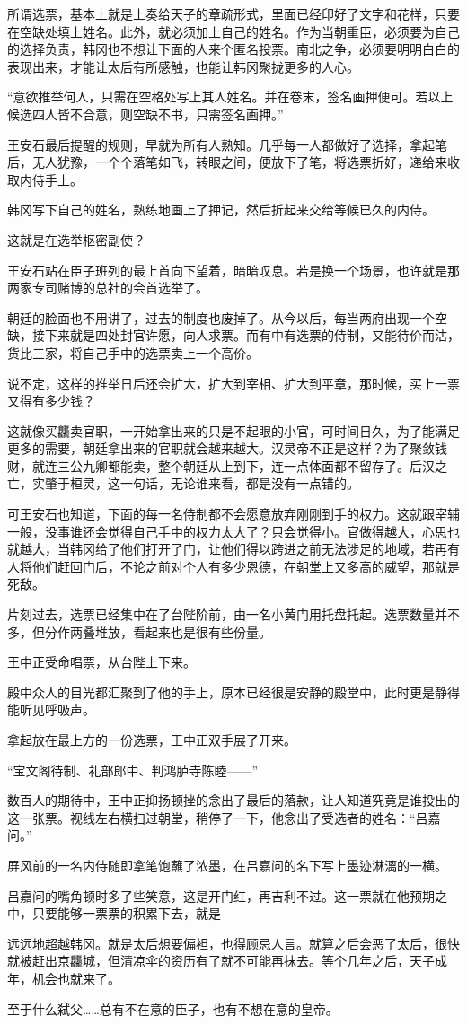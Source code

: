 所谓选票，基本上就是上奏给天子的章疏形式，里面已经印好了文字和花样，只要在空缺处填上姓名。此外，就必须加上自己的姓名。作为当朝重臣，必须要为自己的选择负责，韩冈也不想让下面的人来个匿名投票。南北之争，必须要明明白白的表现出来，才能让太后有所感触，也能让韩冈聚拢更多的人心。

“意欲推举何人，只需在空格处写上其人姓名。并在卷末，签名画押便可。若以上候选四人皆不合意，则空缺不书，只需签名画押。”

王安石最后提醒的规则，早就为所有人熟知。几乎每一人都做好了选择，拿起笔后，无人犹豫，一个个落笔如飞，转眼之间，便放下了笔，将选票折好，递给来收取内侍手上。

韩冈写下自己的姓名，熟练地画上了押记，然后折起来交给等候已久的内侍。

这就是在选举枢密副使？

王安石站在臣子班列的最上首向下望着，暗暗叹息。若是换一个场景，也许就是那两家专司赌博的总社的会首选举了。

朝廷的脸面也不用讲了，过去的制度也废掉了。从今以后，每当两府出现一个空缺，接下来就是四处封官许愿，向人求票。而有中有选票的侍制，又能待价而沽，货比三家，将自己手中的选票卖上一个高价。

说不定，这样的推举日后还会扩大，扩大到宰相、扩大到平章，那时候，买上一票又得有多少钱？

这就像买龘卖官职，一开始拿出来的只是不起眼的小官，可时间日久，为了能满足更多的需要，朝廷拿出来的官职就会越来越大。汉灵帝不正是这样？为了聚敛钱财，就连三公九卿都能卖，整个朝廷从上到下，连一点体面都不留存了。后汉之亡，实肇于桓灵，这一句话，无论谁来看，都是没有一点错的。

可王安石也知道，下面的每一名侍制都不会愿意放弃刚刚到手的权力。这就跟宰辅一般，没事谁还会觉得自己手中的权力太大了？只会觉得小。官做得越大，心思也就越大，当韩冈给了他们打开了门，让他们得以跨进之前无法涉足的地域，若再有人将他们赶回门后，不论之前对个人有多少恩德，在朝堂上又多高的威望，那就是死敌。

片刻过去，选票已经集中在了台陛阶前，由一名小黄门用托盘托起。选票数量并不多，但分作两叠堆放，看起来也是很有些份量。

王中正受命唱票，从台陛上下来。

殿中众人的目光都汇聚到了他的手上，原本已经很是安静的殿堂中，此时更是静得能听见呼吸声。

拿起放在最上方的一份选票，王中正双手展了开来。

“宝文阁待制、礼部郎中、判鸿胪寺陈睦——”

数百人的期待中，王中正抑扬顿挫的念出了最后的落款，让人知道究竟是谁投出的这一张票。视线左右横扫过朝堂，稍停了一下，他念出了受选者的姓名：“吕嘉问。”

屏风前的一名内侍随即拿笔饱蘸了浓墨，在吕嘉问的名下写上墨迹淋漓的一横。

吕嘉问的嘴角顿时多了些笑意，这是开门红，再吉利不过。这一票就在他预期之中，只要能够一票票的积累下去，就是

远远地超越韩冈。就是太后想要偏袒，也得顾忌人言。就算之后会恶了太后，很快就被赶出京龘城，但清凉伞的资历有了就不可能再抹去。等个几年之后，天子成年，机会也就来了。

至于什么弑父……总有不在意的臣子，也有不想在意的皇帝。


